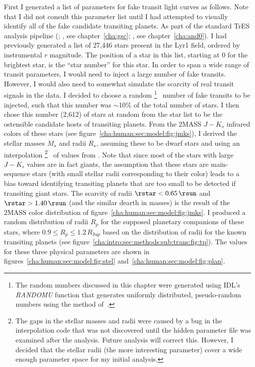 First I generated a list of parameters for fake transit light curves as follows.
Note that I did not consult this parameter list until I had attempted to visually identify all of the fake candidate transiting planets.
As part of the standard TrES analysis pipeline (\citealp[see, e.g.,][]{Dunham_Mandushev_Taylor:pasp:2004a}; \citealp{ODonovan_Charbonneau_Torres:apj:2006a}, see chapter~\ref{cha:gsc}; \citealp{ODonovan_Charbonneau_Alonso:apj:2007a}, see chapter~\ref{cha:and0}).
I had previously generated a list of 27,446 stars present in the Lyr1 field, ordered by instrumental $r$ magnitude.
The position of a star in this list, starting at 0 for the brightest star, is the ``star number'' for this star.
In order to span a wide range of transit parameters, I would need to inject a large number of fake transits.
However, I would also need to somewhat simulate the scarcity of real transit signals in the data.
I decided to choose a random%
\footnote{%
The random numbers discussed in this chapter were generated using IDL's \textit{RANDOMU} function that generates uniformly distributed, pseudo-random numbers using the method of~\citet{Park_Miller:ACM:1988a}.%
}%
\ number of fake transits to be injected, such that this number was $\sim$10\% of the total number of stars.
I then chose this number (2,612) of stars at random from the star list to be the ostensible candidate hosts of transiting planets.
From the 2MASS \citep{Cutri_Skrutskie_van-Dyk:2003a} $J-K_{s}$ infrared colors of these stars (see figure~\ref{cha:human:sec:model:fig:jmks}), I derived the stellar masses $M_{\star}$ and radii $R_{\star}$, assuming these to be dwarf stars and using an interpolation%
\footnote{%
The gaps in the stellar masses and radii were caused by a bug in the interpolation code that was not discovered until the hidden parameter file was examined after the analysis.
Future analysis will correct this.
However, I decided that the stellar radii (the more interesting parameter) cover a wide enough parameter space for my initial analysis.%
}%
\ of values from \citet{Cox::2000a}.
Note that since most of the stars with large $J-K_{s}$ values are in fact giants, the assumption that these stars are main-sequence stars (with small stellar radii corresponding to their color) leads to a bias toward identifying transiting planets that are too small to be detected if transiting giant stars.
The scarcity of radii $\rstar<0.65\,\rsun$ and $\rstar>1.40\,\rsun$ (and the similar dearth in masses) is the result of the 2MASS color distribution of figure~\ref{cha:human:sec:model:fig:jmks}.
I produced a random distribution of radii $R_{p}$ for the supposed planetary companions of these stars, where $0.9\leq R_{p} \leq 1.2\,R_{\mathrm Jup}$ based on the distribution of radii for the known transiting planets (see figure~\ref{cha:intro:sec:methods:sub:trans:fig:tp}).
The values for these three physical parameters are shown in figures~\ref{cha:human:sec:model:fig:stel} and~\ref{cha:human:sec:model:fig:plan}.

